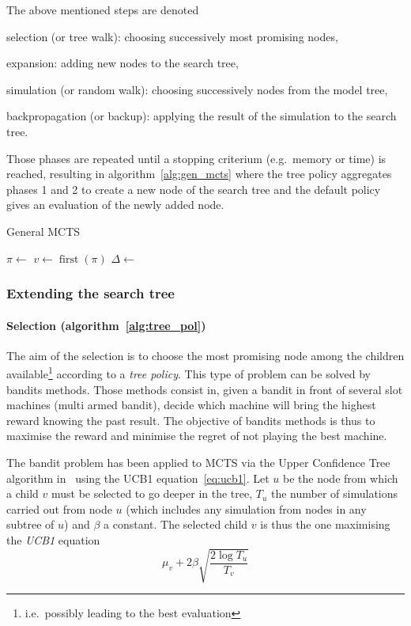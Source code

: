 \documentclass[oneside,twocolumn]{article}
\DeclareMathOperator{\first}{first}
\begin{document}
The above mentioned steps are denoted
\begin{compactenum}
\item selection (or tree walk): choosing successively most promising nodes,
\item expansion: adding new nodes to the search tree,
\item simulation (or random walk): choosing successively nodes from the model
  tree,
\item backpropagation (or backup): applying the result of the simulation to
  the search tree.
\end{compactenum}
Those phases are repeated until a stopping criterium (e.g.\ memory or time) is
reached, resulting in algorithm~\ref{alg:gen_mcts} where the tree policy
aggregates phases 1 and 2 to create a new node of the search tree and the
default policy gives an evaluation of the newly added node.
\begin{algorithm}
  \caption{General MCTS~\cite{browne2012survey}}\label{alg:gen_mcts}
  \begin{algorithmic}
    \State{}\(\pi \gets\) 
    \State{}\(v \gets \first(\pi)\)
    \State{}\(\Delta \gets\) 
    \State{}
    \EndWhile{}
    \EndProcedure{}
  \end{algorithmic}
\end{algorithm}

\subsubsection{Extending the search tree}
\paragraph{Selection (algorithm~\ref{alg:tree_pol})}
The aim of the selection is to choose the most promising node among the children
available\footnote{i.e.\ possibly leading to the best evaluation} according to
a \emph{tree policy}. This type of problem can be solved by bandits methods.
Those methods consist in, given a bandit in front of several slot machines
(multi armed bandit), decide which machine will bring the highest reward knowing
the past result. The objective of bandits methods is thus to maximise the reward
and minimise the regret of not playing the best machine.

The bandit problem has been applied to MCTS via the Upper Confidence Tree
algorithm in~\cite{kocsis2006bandit} using the UCB1 equation~\ref{eq:ucb1}.
Let \(u\) be the node from which a child \(v\) must be selected to go deeper in
the tree, \(T_u\) the number of simulations carried out from node \(u\)
(which includes any simulation from nodes in any subtree of \(u\)) and
\(\beta\) a constant. The selected child \(v\) is thus the one maximising the
\emph{UCB1} equation
\begin{equation}
  \label{eq:ucb1}
  \mu_v + 2 \beta \sqrt{\frac{2 \log T_u}{T_v}}
\end{equation}
\end{document}
